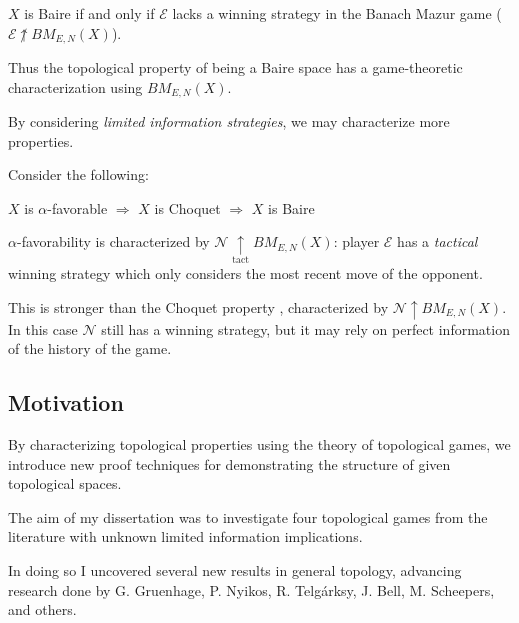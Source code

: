 \documentclass{beamer}
\theoremstyle{definition}
\newcommand{\win}{\uparrow}
\newcommand{\tactwin}{\underset{\text{tact}}{\uparrow}}
\newcommand{\<}{\langle}
\renewcommand{\>}{\rangle}
\newcommand{\pl}[1]{\mathscr{#1}}
\newcommand{\term}{\textit}
\newcommand{\bmGame}[1]{{BM}_{E,N}(#1)}
\begin{document}
\begin{frame}
  \begin{theorem}
    $X$ is Baire if and only if $\pl E$ lacks a winning strategy
    in the Banach Mazur game ($\pl E\not\win\bmGame{X}$).
  \end{theorem}

  \pause

  Thus the topological property of being a Baire space has a game-theoretic
  characterization using $\bmGame{X}$.

  \vpause

  By considering \term{limited information strategies}, we may characterize
  more properties.
\end{frame}

\begin{frame}
  Consider the following:

  \begin{theorem}
    $X$ is $\alpha$-favorable $\Rightarrow$
    $X$ is Choquet $\Rightarrow$
    $X$ is Baire
  \end{theorem}

  \pause

  $\alpha$-favorability is characterized by $\pl N\tactwin\bmGame{X}$:
  player $\pl E$ has a \term{tactical} winning strategy which only considers
  the most recent move of the opponent.

  \vpause

  This is stronger than the Choquet property \cite{MR817083},
  characterized by $\pl N\win\bmGame{X}$.
  In this case $\pl N$ still has a winning strategy, but it may
  rely on perfect information of the history of the game.
\end{frame}

\subsection{Motivation}

\begin{frame}
  By characterizing topological properties using the theory of
  topological games, we introduce new proof techniques for demonstrating
  the structure of given topological spaces.

  \vpause

  The aim of my dissertation was to investigate four topological games
  from the literature with unknown limited information implications.

  \vpause

  In doing so I uncovered several new results in general topology,
  advancing research done by
  G. Gruenhage, P. Nyikos, R. Telg{\' a}rksy, J. Bell,
  M. Scheepers, and others.
\end{frame}
\end{document}
